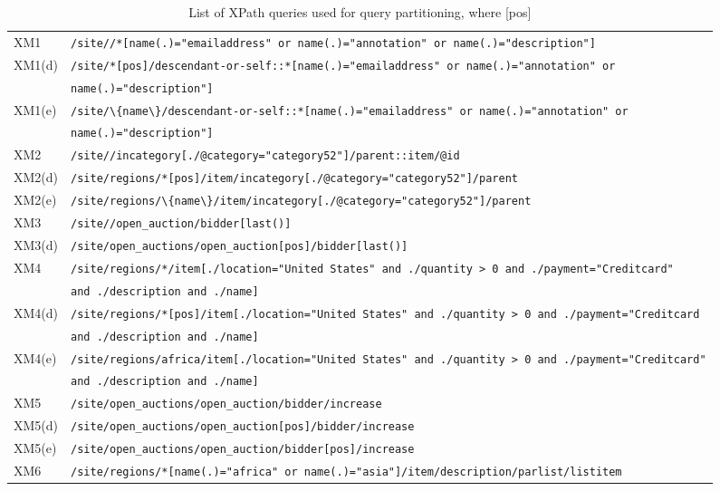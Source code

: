 \begin{sidewaystable}
	\centering
	\caption{List of XPath queries used for query partitioning, where [pos]}
	\label{tab:qpsqueries}
	\small
	\begin{tabular}{l|l}
		\hline
		XM1 & \verb|/site//*[name(.)="emailaddress" or name(.)="annotation" or name(.)="description"]| \\
		XM1(d) & \verb|/site/*[pos]/descendant-or-self::*[name(.)="emailaddress" or name(.)="annotation" or|\\
		& \verb|name(.)="description"]|\\
		XM1(e) & \verb|/site/\{name\}/descendant-or-self::*[name(.)="emailaddress" or name(.)="annotation" or|\\
		& \verb|name(.)="description"]|\\
		\hline
		XM2 & \verb|/site//incategory[./@category="category52"]/parent::item/@id| \\
		XM2(d) & \verb|/site/regions/*[pos]/item/incategory[./@category="category52"]/parent|\\
		XM2(e) & \verb|/site/regions/\{name\}/item/incategory[./@category="category52"]/parent|\\
		\hline
		XM3 & \verb|/site//open_auction/bidder[last()]|\\
		XM3(d) & \verb|/site/open_auctions/open_auction[pos]/bidder[last()]|\\
		\hline
		XM4 & \verb|/site/regions/*/item[./location="United States" and ./quantity > 0 and ./payment="Creditcard"| \\
		& \verb|and ./description and ./name]|\\
		XM4(d) & \verb|/site/regions/*[pos]/item[./location="United States" and ./quantity > 0 and ./payment="Creditcard|\\
		& \verb|and ./description and ./name]|\\
		XM4(e) & \verb|/site/regions/africa/item[./location="United States" and ./quantity > 0 and ./payment="Creditcard"|\\
		& \verb|and ./description and ./name]|\\
		\hline
		XM5 & \verb|/site/open_auctions/open_auction/bidder/increase| \\
		XM5(d) & \verb|/site/open_auctions/open_auction[pos]/bidder/increase|\\
		\hline
		XM5(e) & \verb|/site/open_auctions/open_auction/bidder[pos]/increase|\\
		\hline
		XM6 & \verb|/site/regions/*[name(.)="africa" or name(.)="asia"]/item/description/parlist/listitem| \\

\end{tabular}
\end{sidewaystable}
